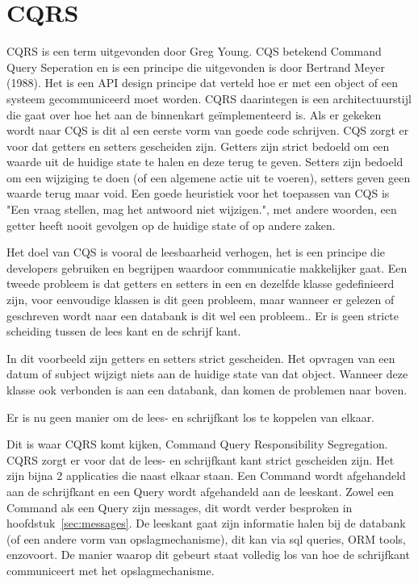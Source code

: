 
\chapter{CQRS}
\label{ch:CQRS}

CQRS is een term uitgevonden door Greg Young. CQS betekend Command Query Seperation en is een principe die uitgevonden is door Bertrand Meyer (1988). Het is een API design principe dat verteld hoe er met een object of een systeem gecommuniceerd moet worden. CQRS daarintegen is een architectuurstijl die gaat over hoe het aan de binnenkart geïmplementeerd is. Als er gekeken wordt naar CQS is dit al een eerste vorm van goede code schrijven. CQS zorgt er voor dat getters en setters gescheiden zijn. Getters zijn strict bedoeld om een waarde uit de huidige state te halen en deze terug te geven. Setters zijn bedoeld om een wijziging te doen (of een algemene actie uit te voeren), setters geven geen waarde terug maar void. Een goede heuristiek voor het toepassen van CQS is "Een vraag stellen, mag het antwoord niet wijzigen.", met andere woorden, een getter heeft nooit gevolgen op de huidige state of op andere zaken.

Het doel van CQS is vooral de leesbaarheid verhogen, het is een principe die developers gebruiken en begrijpen waardoor communicatie makkelijker gaat.
Een tweede probleem is dat getters en setters in een en dezelfde klasse gedefinieerd zijn, voor eenvoudige klassen is dit geen probleem, maar wanneer er gelezen of geschreven wordt naar een databank is dit wel een probleem.. Er is geen stricte scheiding tussen de lees kant en de schrijf kant.


In dit voorbeeld zijn getters en setters strict gescheiden. Het opvragen van een datum of subject wijzigt niets aan de huidige state van dat object. Wanneer deze klasse ook verbonden is aan een databank, dan komen de problemen naar boven.


Er is nu geen manier om de lees- en schrijfkant los te koppelen van elkaar.

Dit is waar CQRS komt kijken, Command Query Responsibility Segregation. CQRS zorgt er voor dat de lees- en schrijfkant kant strict gescheiden zijn. Het zijn bijna 2 applicaties die naast elkaar staan. Een Command wordt afgehandeld aan de schrijfkant en een Query wordt afgehandeld aan de leeskant. Zowel een Command als een Query zijn messages, dit wordt verder besproken in hoofdstuk~\ref{sec:messages}. De leeskant gaat zijn informatie halen bij de databank (of een andere vorm van opslagmechanisme), dit kan via sql queries, ORM tools, enzovoort. De manier waarop dit gebeurt staat volledig los van hoe de schrijfkant communiceert met het opslagmechanisme. 

